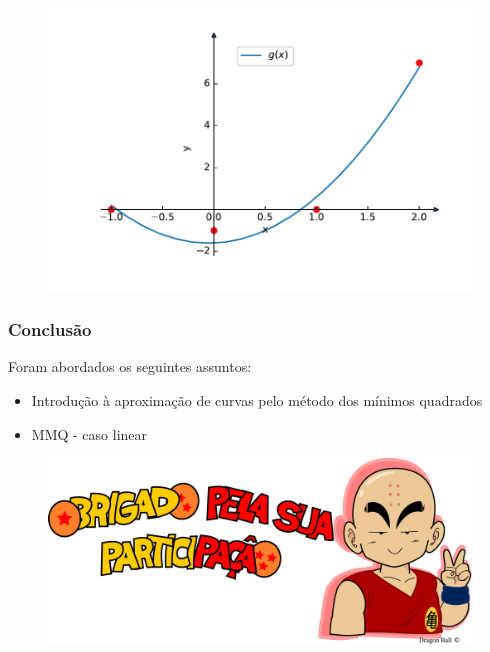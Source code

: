 \documentclass{beamer}
\theoremstyle{mystyle}
\begin{document}
	\begin{frame}
		\begin{figure}
			\centering
			\includegraphics[width=1.0\linewidth]{Figuras/grafico_06}
			\label{fig:grafico06}
		\end{figure}
	\end{frame}
 
\begin{frame}
	\frametitle{Conclusão}	
	Foram abordados os seguintes assuntos:
	\begin{itemize}
		\item Introdução à aproximação de curvas pelo método dos mínimos quadrados
		\item MMQ - caso linear
	\end{itemize}
\end{frame}


\begin{frame}[plain]
\bigskip
\bigskip
\bigskip
\bigskip
\bigskip
\begin{figure}
	\centering
	\includegraphics[width=0.9\linewidth]{../krillin_v}
	\label{fig:luffyv}
\end{figure}
\end{frame}
\end{document}
